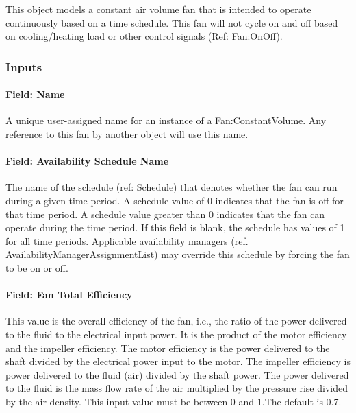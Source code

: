 This object models a constant air volume fan that is intended to operate continuously based on a time schedule. This fan will not cycle on and off based on cooling/heating load or other control signals (Ref: Fan:OnOff).

\subsubsection{Inputs}\label{inputs-019}

\paragraph{Field: Name}\label{field-name-018}

A unique user-assigned name for an instance of a Fan:ConstantVolume. Any reference to this fan by another object will use this name.

\paragraph{Field: Availability Schedule Name}\label{field-availability-schedule-name-007}

The name of the schedule (ref: Schedule) that denotes whether the fan can run during a given time period. A schedule value of 0 indicates that the fan is off for that time period. A schedule value greater than 0 indicates that the fan can operate during the time period. If this field is blank, the schedule has values of 1 for all time periods. Applicable availability managers (ref. AvailabilityManagerAssignmentList) may override this schedule by forcing the fan to be on or off.

\paragraph{Field: Fan Total Efficiency}\label{field-fan-total-efficiency-000}

This value is the overall efficiency of the fan, i.e., the ratio of the power delivered to the fluid to the electrical input power. It is the product of the motor efficiency and the impeller efficiency. The motor efficiency is the power delivered to the shaft divided by the electrical power input to the motor. The impeller efficiency is power delivered to the fluid (air) divided by the shaft power. The power delivered to the fluid is the mass flow rate of the air multiplied by the pressure rise divided by the air density. This input value must be between 0 and 1.The default is 0.7.

